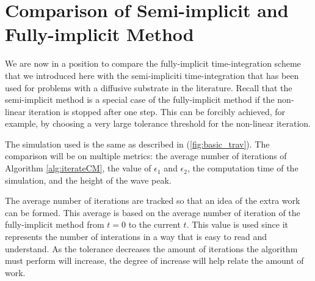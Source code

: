 \section{Comparison of Semi-implicit and Fully-implicit Method}
   We are now in a position to compare the fully-implicit time-integration scheme that we introduced here with the semi-impliciti time-integration that has been used for problems with a diffusive substrate in the literature. %
   Recall that the semi-implicit method is a special case of the fully-implicit method if the non-linear iteration is stopped after one step.
   This can be forcibly achieved, for example, by choosing a very large tolerance threshold for the non-linear iteration.

  The simulation used is the same as described in (\ref{fig:basic_trav}).
  The comparison will be on multiple metrics: the average number of iterations of Algorithm \ref{alg:iterateCM}, the value of $\epsilon_1$ and $\epsilon_2$, the computation time of the simulation, and the height of the wave peak.

  The average number of iterations are tracked so that an idea of the extra work can be formed.
  This average is based on the average number of iteration of the fully-implicit method from $t=0$ to the current $t$.
  This value is used since it represents the number of interations in a way that is easy to read and understand.
  As the tolerance decreases the amount of iterations the algorithm must perform will increase, the degree of increase will help relate the amount of work.

